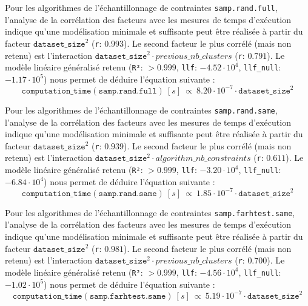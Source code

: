 			Pour les algorithmes de l'échantillonnage de contraintes \texttt{samp.rand.full}, l'analyse de la corrélation des facteurs avec les mesures de temps d'exécution indique qu'une modélisation minimale et suffisante peut être réalisée à partir du facteur $\texttt{dataset\_size}^{2}$ (\texttt{r}: $0.993$).
			Le second facteur le plus corrélé (mais non retenu) est l'interaction $\texttt{dataset\_size}^{2} \cdot previous\_nb\_clusters$ (\texttt{r}: $0.791$).
			Le modèle linéaire généralisé retenu (\texttt{R²}: $> 0.999$, \texttt{llf}: $-4.52 \cdot 10^{4}$, \texttt{llf\_null}: $-1.17 \cdot 10^{5}$) nous permet de déduire l'équation suivante :
			\begin{equation}
				\texttt{computation\_time}(\texttt{samp.rand.full})~[s]~
				\propto~8.20 \cdot 10^{-7} \cdot \texttt{dataset\_size}^{2}
			\end{equation}
			
			Pour les algorithmes de l'échantillonnage de contraintes \texttt{samp.rand.same}, l'analyse de la corrélation des facteurs avec les mesures de temps d'exécution indique qu'une modélisation minimale et suffisante peut être réalisée à partir du facteur $\texttt{dataset\_size}^{2}$ (\texttt{r}: $0.939$).
			Le second facteur le plus corrélé (mais non retenu) est l'interaction $\texttt{dataset\_size}^{2} \cdot algorithm\_nb\_constraints$ (\texttt{r}: $0.611$).
			Le modèle linéaire généralisé retenu (\texttt{R²}: $> 0.999$, \texttt{llf}: $-3.20 \cdot 10^{4}$, \texttt{llf\_null}: $-6.84 \cdot 10^{4}$) nous permet de déduire l'équation suivante :
			\begin{equation}
				\texttt{computation\_time}(\texttt{samp.rand.same})~[s]~
				\propto~1.85 \cdot 10^{-7} \cdot \texttt{dataset\_size}^{2}
			\end{equation}
			
			Pour les algorithmes de l'échantillonnage de contraintes \texttt{samp.farhtest.same}, l'analyse de la corrélation des facteurs avec les mesures de temps d'exécution indique qu'une modélisation minimale et suffisante peut être réalisée à partir du facteur $\texttt{dataset\_size}^{2}$ (\texttt{r}: $0.981$).
			Le second facteur le plus corrélé (mais non retenu) est l'interaction $\texttt{dataset\_size}^{2} \cdot previous\_nb\_clusters$ (\texttt{r}: $0.700$).
			Le modèle linéaire généralisé retenu (\texttt{R²}: $> 0.999$, \texttt{llf}: $-4.56 \cdot 10^{4}$, \texttt{llf\_null}: $-1.02 \cdot 10^{5}$) nous permet de déduire l'équation suivante :
			\begin{equation}
				\texttt{computation\_time}(\texttt{samp.farhtest.same})~[s]~
				\propto~5.19 \cdot 10^{-7} \cdot \texttt{dataset\_size}^{2}
			\end{equation}
			
